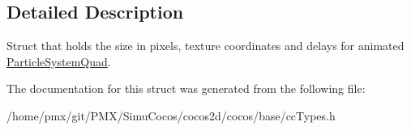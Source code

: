 \subsection{Detailed Description}
Struct that holds the size in pixels, texture coordinates and delays for animated \hyperlink{classParticleSystemQuad}{Particle\+System\+Quad}. 

The documentation for this struct was generated from the following file\+:\begin{DoxyCompactItemize}
\item 
/home/pmx/git/\+P\+M\+X/\+Simu\+Cocos/cocos2d/cocos/base/cc\+Types.\+h\end{DoxyCompactItemize}
